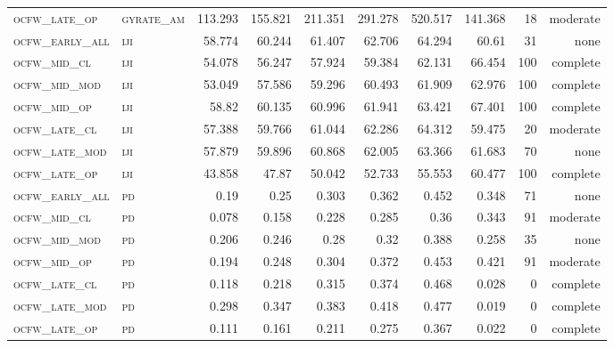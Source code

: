 \begin{landscape}
\begin{center}
\begin{footnotesize}
\begin{longtable}{llrrrrr|rrr}
\textsc{ocfw\_late\_op  } & \textsc{gyrate\_am}    & 113.293  & 155.821  & 211.351  & 291.278  & 520.517  & 141.368  & 18  & moderate \\
\textsc{ocfw\_early\_all} & \textsc{iji       }    & 58.774   & 60.244   & 61.407   & 62.706   & 64.294   & 60.61    & 31  & none     \\
\textsc{ocfw\_mid\_cl   } & \textsc{iji       }    & 54.078   & 56.247   & 57.924   & 59.384   & 62.131   & 66.454   & 100 & complete \\
\textsc{ocfw\_mid\_mod  } & \textsc{iji       }    & 53.049   & 57.586   & 59.296   & 60.493   & 61.909   & 62.976   & 100 & complete \\
\textsc{ocfw\_mid\_op   } & \textsc{iji       }    & 58.82    & 60.135   & 60.996   & 61.941   & 63.421   & 67.401   & 100 & complete \\
\textsc{ocfw\_late\_cl  } & \textsc{iji       }    & 57.388   & 59.766   & 61.044   & 62.286   & 64.312   & 59.475   & 20  & moderate \\
\textsc{ocfw\_late\_mod } & \textsc{iji       }    & 57.879   & 59.896   & 60.868   & 62.005   & 63.366   & 61.683   & 70  & none     \\
\textsc{ocfw\_late\_op  } & \textsc{iji       }    & 43.858   & 47.87    & 50.042   & 52.733   & 55.553   & 60.477   & 100 & complete \\
\textsc{ocfw\_early\_all} & \textsc{pd        }    & 0.19     & 0.25     & 0.303    & 0.362    & 0.452    & 0.348    & 71  & none     \\
\textsc{ocfw\_mid\_cl   } & \textsc{pd        }    & 0.078    & 0.158    & 0.228    & 0.285    & 0.36     & 0.343    & 91  & moderate \\
\textsc{ocfw\_mid\_mod  } & \textsc{pd        }    & 0.206    & 0.246    & 0.28     & 0.32     & 0.388    & 0.258    & 35  & none     \\
\textsc{ocfw\_mid\_op   } & \textsc{pd        }    & 0.194    & 0.248    & 0.304    & 0.372    & 0.453    & 0.421    & 91  & moderate \\
\textsc{ocfw\_late\_cl  } & \textsc{pd        }    & 0.118    & 0.218    & 0.315    & 0.374    & 0.468    & 0.028    & 0   & complete \\
\textsc{ocfw\_late\_mod } & \textsc{pd        }    & 0.298    & 0.347    & 0.383    & 0.418    & 0.477    & 0.019    & 0   & complete \\
\textsc{ocfw\_late\_op  } & \textsc{pd        }    & 0.111    & 0.161    & 0.211    & 0.275    & 0.367    & 0.022    & 0   & complete \\

\end{longtable}
\end{footnotesize}
\end{center}
\end{landscape}
